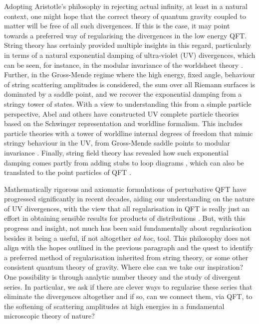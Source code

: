 \documentclass[11pt, letter]{article}
\begin{document}
 Adopting Aristotle's philosophy in rejecting actual infinity, at least in a natural context, one might hope that the correct theory of quantum gravity coupled to matter will be free of all such divergences. If this is the case, it may point towards a preferred way of regularising the   divergences in the low energy QFT.  String theory has certainly provided multiple insights in this regard, particularly in terms of a natural exponential damping of ultra-violet (UV) divergences, which can be seen, for instance, in the modular invariance of the worldsheet theory \citep{dhoker22,Polchinski98}.  Further, in the Gross-Mende regime \citep{GrossMende87,Gross:1987ar} where the high energy, fixed angle, behaviour of string scattering amplitudes is considered, the sum over all Riemann surfaces is dominated by a saddle point, and we recover the exponential damping from a stringy tower of states. With a view to understanding this from a simple particle perspective, Abel and others \citep{Abel19,Abel20} have constructed UV complete particle theories based on the Schwinger representation and  worldline formalism. This includes  particle theories with a tower of worldline internal degrees of freedom that mimic stringy behaviour in the UV, from Gross-Mende saddle points to modular invariance  \citep{Abel20}. Finally, string field theory has revealed how such exponential damping comes partly from adding stubs to loop diagrams \citep{Erbin21}, which can also be translated to the point particles of QFT \citep{Chiaffrino22}.
 
 

Mathematically rigorous and axiomatic formulations of perturbative QFT have progressed significantly in recent decades, aiding our understanding on the nature of UV divergences, with the view that all regularisation in QFT is really just an effort in obtaining sensible results for products of distributions \citep{Latorre94}. But, with this progress and insight, not much has been said fundamentally about regularisation besides it being a useful, if not altogether \textit{ad hoc}, tool.   This philosophy does not align with the hopes outlined in the previous paragraph and the quest to identify a preferred method of regularisation inherited from string theory, or some other consistent quantum theory of gravity. Where else can we take our inspiration? One possibility is through analytic number theory and the study of divergent series.  In particular, we  ask if there  are clever ways to regularise these series that eliminate the divergences altogether and if so, can we connect them, via QFT, to the softening of scattering amplitudes at high energies   in a fundamental microscopic theory of nature?
\end{document}
